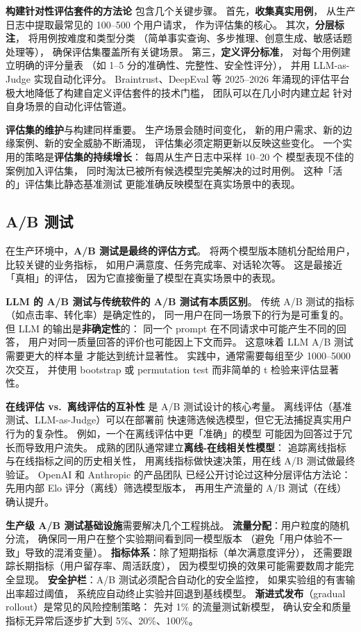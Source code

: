 \textbf{构建针对性评估套件的方法论}
包含几个关键步骤。
首先，\textbf{收集真实用例}，
从生产日志中提取最常见的 100--500 个用户请求，
作为评估集的核心。
其次，\textbf{分层标注}，
将用例按难度和类型分类
（简单事实查询、多步推理、创意生成、敏感话题处理等），
确保评估集覆盖所有关键场景。
第三，\textbf{定义评分标准}，
对每个用例建立明确的评分量表
（如 1--5 分的准确性、完整性、安全性评分），
并用 LLM-as-Judge 实现自动化评分。
Braintrust、DeepEval 等 2025--2026 年涌现的评估平台
极大地降低了构建自定义评估套件的技术门槛，
团队可以在几小时内建立起
针对自身场景的自动化评估管道。

\textbf{评估集的维护}与构建同样重要。
生产场景会随时间变化，
新的用户需求、新的边缘案例、新的安全威胁不断涌现，
评估集必须定期更新以反映这些变化。
一个实用的策略是\textbf{评估集的持续增长}：
每周从生产日志中采样 10--20 个
模型表现不佳的案例加入评估集，
同时淘汰已被所有候选模型完美解决的过时用例。
这种「活的」评估集比静态基准测试
更能准确反映模型在真实场景中的表现。

\subsection{A/B 测试}

在生产环境中，\textbf{A/B 测试是最终的评估方式}。
将两个模型版本随机分配给用户，
比较关键的业务指标，
如用户满意度、任务完成率、对话轮次等。
这是最接近「真相」的评估，
因为它直接衡量了模型在真实场景中的表现。

\textbf{LLM 的 A/B 测试与传统软件的 A/B 测试有本质区别}。
传统 A/B 测试的指标（如点击率、转化率）是确定性的，
同一用户在同一场景下的行为是可重复的。
但 LLM 的输出是\textbf{非确定性}的：
同一个 prompt 在不同请求中可能产生不同的回答，
用户对同一质量回答的评价也可能因上下文而异。
这意味着 LLM A/B 测试需要更大的样本量
才能达到统计显著性。
实践中，通常需要每组至少 1000--5000 次交互，
并使用 bootstrap 或 permutation test
而非简单的 t 检验来评估显著性。

\textbf{在线评估 vs.\ 离线评估的互补性}
是 A/B 测试设计的核心考量。
离线评估（基准测试、LLM-as-Judge）可以在部署前
快速筛选候选模型，但它无法捕捉真实用户行为的复杂性。
例如，一个在离线评估中更「准确」的模型
可能因为回答过于冗长而导致用户流失。
成熟的团队通常建立\textbf{离线-在线相关性模型}：
追踪离线指标与在线指标之间的历史相关性，
用离线指标做快速决策，用在线 A/B 测试做最终验证。
OpenAI 和 Anthropic 的产品团队
已经公开讨论过这种分层评估方法论：
先用内部 Elo 评分（离线）筛选模型版本，
再用生产流量的 A/B 测试（在线）确认提升。

\textbf{生产级 A/B 测试基础设施}需要解决几个工程挑战。
\textbf{流量分配}：用户粒度的随机分流，
确保同一用户在整个实验期间看到同一模型版本
（避免「用户体验不一致」导致的混淆变量）。
\textbf{指标体系}：除了短期指标（单次满意度评分），
还需要跟踪长期指标（用户留存率、周活跃度），
因为模型切换的效果可能需要数周才能完全显现。
\textbf{安全护栏}：A/B 测试必须配合自动化的安全监控，
如果实验组的有害输出率超过阈值，
系统应自动终止实验并回退到基线模型。
\textbf{渐进式发布}（gradual rollout）是常见的风险控制策略：
先对 1\% 的流量测试新模型，
确认安全和质量指标无异常后逐步扩大到 5\%、20\%、100\%。

